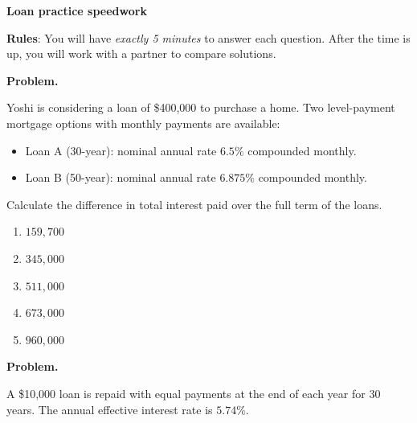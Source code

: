 \documentclass[11pt]{article}
\begin{document}
\begin{center}
{\Huge \textbf{Loan practice speedwork}}\\
\vspace{0.3em}
\end{center}


\bigskip

\bigskip

\bigskip

\bigskip
\bigskip

\bigskip

\bigskip

\bigskip

\begin{center}
    \begin{Large}
        \textbf{Rules}: You will have \textit{exactly 5 minutes} to answer each question. After the time is up, you will work with a partner to compare solutions.
    \end{Large}
\end{center}


\newpage

\textbf{Problem.}

Yoshi is considering a loan of \$400{,}000 to purchase a home. Two level-payment mortgage options with monthly payments are available:

\begin{itemize}
    \item Loan A (30-year): nominal annual rate $6.5\%$ compounded monthly.
    \item Loan B (50-year): nominal annual rate $6.875\%$ compounded monthly.
\end{itemize}

Calculate the difference in total interest paid over the full term of the loans.

\begin{enumerate}[label=\Alph*.]
    \item $159{,}700$
    \item $345{,}000$
    \item $511{,}000$
    \item $673{,}000$
    \item $960{,}000$
\end{enumerate}


\newpage


\textbf{Problem.}

A \$10{,}000 loan is repaid with equal payments at the end of each year for 30 years. The annual effective interest rate is $5.74\%$.
\end{document}

